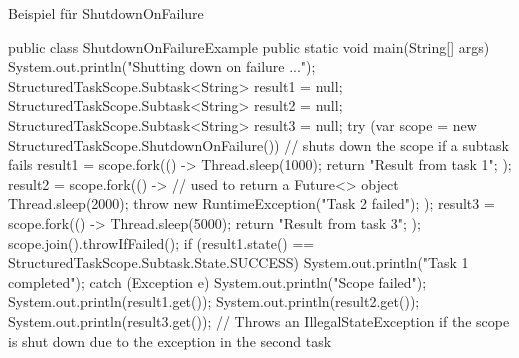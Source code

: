     \begin{program} [H]
        \caption{Beispiel für ShutdownOnFailure}
        \label{prog:BeispielFürShutdownOnFailure}
    \begin{JavaCode}[language=Java, numbers=left]
public class ShutdownOnFailureExample {
    public static void main(String[] args) {
        System.out.println("Shutting down on failure ...");
        StructuredTaskScope.Subtask<String> result1 = null;
        StructuredTaskScope.Subtask<String> result2 = null;
        StructuredTaskScope.Subtask<String> result3 = null;
        try (var scope = new StructuredTaskScope.ShutdownOnFailure()) {            // shuts down the scope if a subtask fails
            result1 = scope.fork(() -> {
                Thread.sleep(1000);
                return "Result from task 1";
            });
            result2 = scope.fork(() -> {                                           // used to return a Future<> object
                Thread.sleep(2000);
                throw new RuntimeException("Task 2 failed");
            });
            result3 = scope.fork(() -> {
                Thread.sleep(5000);
                return "Result from task 3";
            });
            scope.join().throwIfFailed();
            if (result1.state() == StructuredTaskScope.Subtask.State.SUCCESS) {
                System.out.println("Task 1 completed");
            }
        } catch (Exception e) {
            System.out.println("Scope failed");
        }
        System.out.println(result1.get());                                          
        System.out.println(result2.get());
        System.out.println(result3.get());                      // Throws an IllegalStateException if the scope is shut down due to the exception in the second task
    }
}
    \end{JavaCode}
    \end{program}
    


